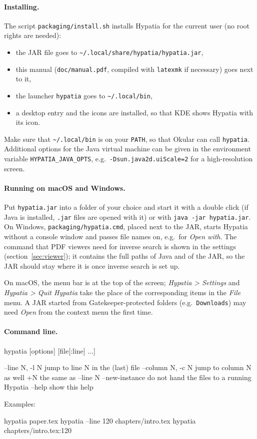 \documentclass[11pt]{article}
\newcommand{\menu}[1]{\textsf{\textit{#1}}}
\newcommand{\file}[1]{\texttt{#1}}
\begin{document}
    \paragraph{Installing.}     The script \file{packaging/install.sh} installs Hypatia for the current user (no root rights are needed):
    \begin{itemize}
        \itemsep-1mm
        \item the JAR file goes to \file{\textasciitilde/.local/share/hypatia/hypatia.jar},
        \item this manual (\file{doc/manual.pdf}, compiled with \verb+latexmk+ if necessary) goes next to it,
        \item the launcher \verb+hypatia+ goes to \file{\textasciitilde/.local/bin},
        \item a desktop entry and the icons are installed, so that KDE shows Hypatia with its icon.
    \end{itemize}
    Make sure that \file{\textasciitilde/.local/bin} is on your \verb+PATH+, so that Okular can call \verb+hypatia+. Additional options for the Java virtual machine can be given in the environment variable \verb+HYPATIA_JAVA_OPTS+, e.g.\ \verb+-Dsun.java2d.uiScale=2+ for a high-resolution screen.

    \paragraph{Running on macOS and Windows.}     Put \file{hypatia.jar} into a folder of your choice and start it with a double click (if Java is installed, \file{.jar} files are opened with it) or with \verb+java -jar hypatia.jar+. On Windows, \file{packaging/hypatia.cmd}, placed next to the JAR, starts Hypatia without a console window and passes file names on, e.g.\ for \menu{Open with}. The command that PDF viewers need for inverse search is shown in the settings (section~\ref{sec:viewer}); it contains the full paths of Java and of the JAR, so the JAR should stay where it is once inverse search is set up.

    On macOS, the menu bar is at the top of the screen; \menu{Hypatia > Settings} and \menu{Hypatia > Quit Hypatia} take the place of the corresponding items in the \menu{File} menu. A JAR started from Gatekeeper-protected folders (e.g.\ \file{Downloads}) may need \menu{Open} from the context menu the first time.

    \paragraph{Command line.}\label{sec:cmdline}     \begin{Code}
hypatia [options] [file[:line] ...]

  --line N, -l N     jump to line N in the (last) file
  --column N, -c N   jump to column N as well
  +N                 the same as --line N
  --new-instance     do not hand the files to a running Hypatia
  --help             show this help
    \end{Code}
    Examples:
    \begin{Code}
hypatia paper.tex
hypatia --line 120 chapters/intro.tex
hypatia chapters/intro.tex:120
    \end{Code}
\end{document}
